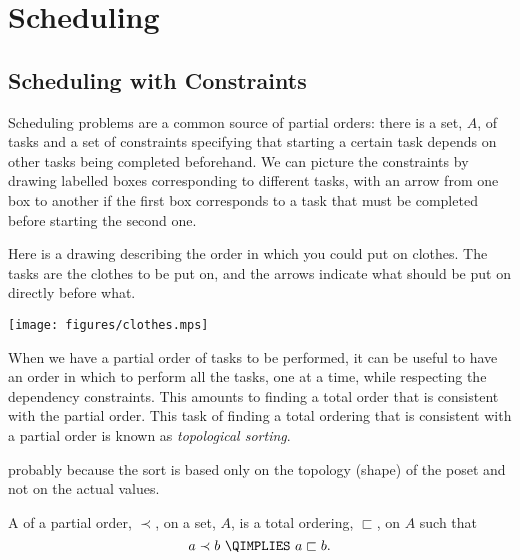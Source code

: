 \begin{problems}
\classproblems
{}
\end{problems}

\section{Scheduling}

\subsection{Scheduling with Constraints}
Scheduling problems are a common source of partial orders: there is a set,
$A$, of tasks and a set of constraints specifying that starting a certain
task depends on other tasks being completed beforehand.  We can picture
the constraints by drawing labelled boxes corresponding to different
tasks, with an arrow from one box to another if the first box corresponds
to a task that must be completed before starting the second one.

\begin{samepage}
\begin{example}\label{cloth}
Here is a drawing describing the order in which you could put on clothes.
The tasks are the clothes to be put on, and the arrows indicate what should be
put on directly before what.
\begin{center}\texttt{[image: figures/clothes.mps]}\end{center}
\end{example}
\end{samepage}

When we have a partial order of tasks to be performed, it can be useful to
have an order in which to perform all the tasks, one at a time, while
respecting the dependency constraints.  This amounts to finding a total
order that is consistent with the partial order.  This task of finding a
total ordering that is consistent with a partial order is known as
\emph{topological sorting}. 

\begin{staffnotes}
probably because the sort is based only on the topology (shape) of the
poset and not on the actual values.
\end{staffnotes}

\begin{definition}
A  of a partial order, $\prec$, on a set, $A$, is
a total ordering, $\sqsubset$, on $A$ such that
\[
a \prec b\ \QIMPLIES\  a \sqsubset b.
\]
\end{definition}

